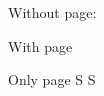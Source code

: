 \documentclass[a5paper]{article}
\begin{document}
Without page: 

With page 

Only page  
\beginnumbering
\pstart
S
\pend
\pstart[\newpage]
S
\pend
\endnumbering
\end{document}
